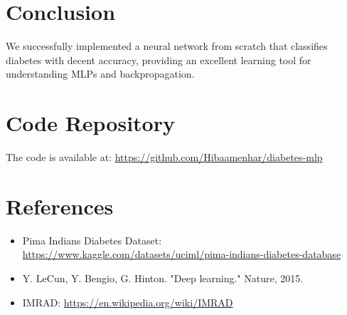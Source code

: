 \documentclass[12pt]{article}
\begin{document}
\section{Conclusion}
We successfully implemented a neural network from scratch that classifies diabetes with decent accuracy, providing an excellent learning tool for understanding MLPs and backpropagation.

\section*{Code Repository}
The code is available at: \url{https://github.com/Hibaamenhar/diabetes-mlp}

\section*{References}
\begin{itemize}
    \item Pima Indians Diabetes Dataset: \url{https://www.kaggle.com/datasets/uciml/pima-indians-diabetes-database}
    \item Y. LeCun, Y. Bengio, G. Hinton. "Deep learning." Nature, 2015.
    \item IMRAD: \url{https://en.wikipedia.org/wiki/IMRAD}
\end{itemize}
\end{document}

